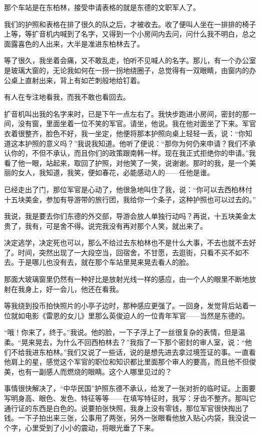 \par 那个车站是在东柏林，接受申请表格的就是东德的文职军人了。
\par 我们的护照和表格在排了很久的队之后，才被收去。收了便叫人坐在一排排的椅子上等，等扩音机内喊到了名字，又得到一个小房间内去问，问什么我不明白，总之面露喜色的人出来，大半是准进东柏林去了。
\par 等了很久，我坐着会痛，又不敢乱走，怕听不见喊人的名字。那儿，有一个办公室是玻璃大窗的，无论我如何在一拐一拐地绕圈子，总觉得有一双眼睛，由窗内的办公桌上直射出来，背上有如芒刺般地给钉着。
\par 有人在专注地看我，而我不敢也看回去。
\par 扩音机叫出我的名字来时，已是下午一点左右了。我快步跑进小房间，密封的那一间，没有窗，里面坐着一位不笑的军官。请坐，他说。我在他对面坐了下来。军官衣着很整齐，脸色不好，我一坐定，他便将那本护照向桌上轻轻一丢，说：“你知道这本护照的意义吗？”我说我知道。他听了便说：“那你为何仍来申请？我们不承认你的，不但不承认，而且你们的政策跟南韩一样。现在我正式拒绝你的申请。”我看了他一眼，站起来，取回了护照，对他笑了一笑，说谢谢。那时的我，是一个美丽的女人，我知道，我笑，便如春花，必能感动人的——任他是谁。
\par 已经走出了门，那位军官是心动了，他很急地叫住了我，说：“你可以去西柏林付十五块美金，参加有导游带的旅行团，我给你一个条子，这种护照也可以过去的。”
\par 我说，我是要去你们东德的外交部，导游会放人单独行动吗？再说，十五块美金太贵了，我有，可是舍不得。说完我没有再对那个人笑，就出来了。
\par 决定逃学，决定死也可以，那么不给过去东柏林也不是什么大事，不去也就不去好了。时间，突然出现了一大段空当，回宿舍，不甘愿，去逛街，只看不买不如不去。于是哪儿也没有去，就在那个车站里晃来晃去看人的脸。
\par 那面大玻璃窗里仍然有一种好比是放射光线一样的感应，由一个人的眼里不断地放射在我身上，好一会儿，他还在看我。
\par 等我绕到投币拍快照片的小亭子边时，那种感应更强了。一回身，发觉背后站着一位就如电影《雷恩的女儿》里那么英俊迫人的一位青年军官——当然是东德的。
\par “哦！你来了，终于。”我说。他的脸，一下子浮上了一丝很复杂的表情，但是温柔。“晃来晃去，为什么不回西柏林去？”我指了一下那个密封的审人室，说：“他们不给我进东柏林。”我们又说了一些话，说的是想先进去拿过境签证的事。一直看他肩上的星，感觉这个军官的职位和知识都比里面那个审人的要高，而且他不但俊美，也有一副感人而燃烧的眼睛。这个人哪里见过的？
\par 事情很快解决了，“中华民国”护照东德不承认，给发了一张对折的临时证。上面要写明身高、眼色、发色、特征等等——在填写特征时，我写：牙齿不整齐。那叫它通行证的东西是白色的。说要拍张快照，我身上没有零钱，那位军官很快掏出了钱。一下子拍出来三张，公事用了两张，另外一张眼看他放入贴心内袋，我没说一个字，心里受到了小小的震动，将眼光垂了下来。
